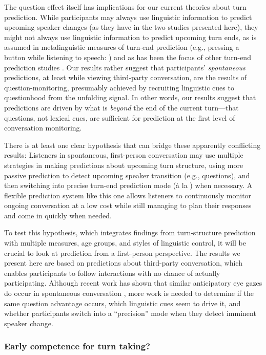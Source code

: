 \documentclass[authoryear, 12pt]{elsarticle}
\begin{document}
The question effect itself has implications for our current theories about turn prediction. While participants may always use linguistic information to predict upcoming speaker changes (as they have in the two studies presented here), they might not always use linguistic information to predict upcoming turn ends, as is assumed in metalinguistic measures of turn-end prediction (e.g., pressing a button while listening to speech: \citealp{torreira2015, magyari2012, de-ruiter2006}) and as has been the focus of other turn-end prediction studies \citealp{ford1996, duncan1972}. Our results rather suggest that participants' \textit{spontaneous} predictions, at least while viewing third-party conversation, are the results of question-monitoring, presumably achieved by recruiting linguistic cues to questionhood from the unfolding signal. In other words, our results suggest that predictions are driven by what is \textit{beyond} the end of the current turn---that questions, not lexical cues, are sufficient for prediction at the first level of conversation monitoring.

There is at least one clear hypothesis that can bridge these apparently conflicting results: Listeners in spontaneous, first-person conversation may use multiple strategies in making predictions about upcoming turn structure, using more passive prediction to detect upcoming speaker transition (e.g., questions), and then switching into precise turn-end prediction mode (\`{a} la \citealp{de-ruiter2006}) when necessary. A flexible prediction system like this one allows listeners to continuously monitor ongoing conversation at a low cost while still managing to plan their responses and come in quickly when needed.

To test this hypothesis, which integrates findings from turn-structure prediction with multiple measures, age groups, and styles of linguistic control, it will be crucial to look at prediction from a first-person perspective. The results we present here are based on predictions about third-party conversation, which enables participants to follow interactions with no chance of actually participating. Although recent work has shown that similar anticipatory eye gazes do occur in spontaneous conversation \citep{holler2015}, more work is needed to determine if the same question advantage occurs, which linguistic cues seem to drive it, and whether participants switch into a ``precision'' mode when they detect imminent speaker change.

\subsubsection{Early competence for turn taking?}
\end{document}
